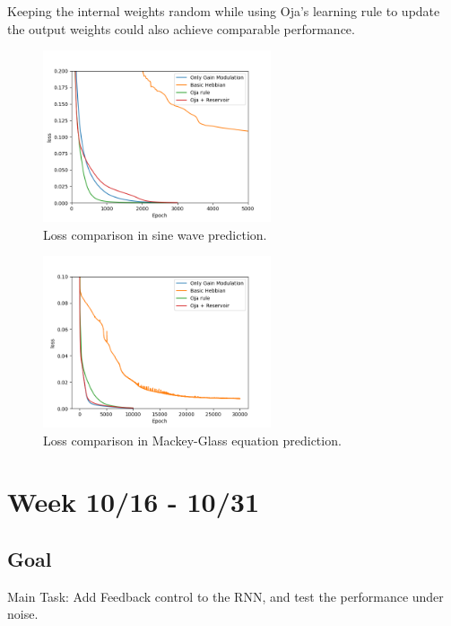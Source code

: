 \documentclass[12pt, a4paper]{article}
\begin{document}
Keeping the internal weights random while using Oja's learning rule to update the output weights could also achieve comparable performance.

\begin{figure}[H]
    \centering
    \includegraphics[width=0.6\textwidth]{fig/sin_loss_compare.png}
     \caption{Loss comparison in sine wave prediction.}
\end{figure}

\begin{figure}[H]
    \centering
    \includegraphics[width=0.6\textwidth]{fig/MG_loss_compare.png}
    \caption{Loss comparison in Mackey-Glass equation prediction.}
\end{figure}

\newpage


\section*{Week 10/16 - 10/31}

\subsection*{Goal}

\noindent
Main Task: Add Feedback control to the RNN, and test the performance under noise.
\end{document}
